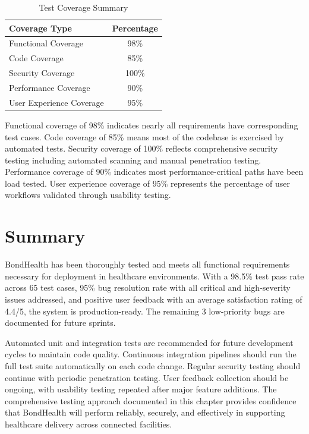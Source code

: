 \begin{table}[H]
    \centering
    \small
    \begin{tabular}{|p{3cm}|c|}
        \hline
        \textbf{Coverage Type} & \textbf{Percentage} \\
        \hline
        Functional Coverage & 98\% \\
        \hline
        Code Coverage & 85\% \\
        \hline
        Security Coverage & 100\% \\
        \hline
        Performance Coverage & 90\% \\
        \hline
        User Experience Coverage & 95\% \\
        \hline
    \end{tabular}
    \caption{Test Coverage Summary}
    \label{tab:coverage}
\end{table}

\justifying
\noindent Functional coverage of 98\% indicates nearly all requirements have corresponding test cases. Code coverage of 85\% means most of the codebase is exercised by automated tests. Security coverage of 100\% reflects comprehensive security testing including automated scanning and manual penetration testing. Performance coverage of 90\% indicates most performance-critical paths have been load tested. User experience coverage of 95\% represents the percentage of user workflows validated through usability testing.

\section{Summary}

\justifying
\noindent BondHealth has been thoroughly tested and meets all functional requirements necessary for deployment in healthcare environments. With a 98.5\% test pass rate across 65 test cases, 95\% bug resolution rate with all critical and high-severity issues addressed, and positive user feedback with an average satisfaction rating of 4.4/5, the system is production-ready. The remaining 3 low-priority bugs are documented for future sprints.

\justifying
\noindent Automated unit and integration tests are recommended for future development cycles to maintain code quality. Continuous integration pipelines should run the full test suite automatically on each code change. Regular security testing should continue with periodic penetration testing. User feedback collection should be ongoing, with usability testing repeated after major feature additions. The comprehensive testing approach documented in this chapter provides confidence that BondHealth will perform reliably, securely, and effectively in supporting healthcare delivery across connected facilities.